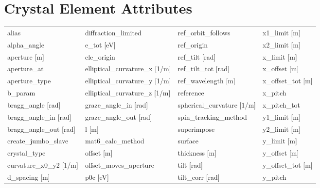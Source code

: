  \section{Crystal Element Attributes}
 \label{s:list.crystal}
 
 \begin{tabular}{llll} \toprule
alias                          & diffraction_limited            & ref_orbit_follows              & x1_limit [m]                   \\
alpha_angle                    & e_tot [eV]                     & ref_origin                     & x2_limit [m]                   \\
aperture [m]                   & ele_origin                     & ref_tilt [rad]                 & x_limit [m]                    \\
aperture_at                    & elliptical_curvature_x [1/m]   & ref_tilt_tot [rad]             & x_offset [m]                   \\
aperture_type                  & elliptical_curvature_y [1/m]   & ref_wavelength [m]             & x_offset_tot [m]               \\
b_param                        & elliptical_curvature_z [1/m]   & reference                      & x_pitch                        \\
bragg_angle [rad]              & graze_angle_in [rad]           & spherical_curvature [1/m]      & x_pitch_tot                    \\
bragg_angle_in [rad]           & graze_angle_out [rad]          & spin_tracking_method           & y1_limit [m]                   \\
bragg_angle_out [rad]          & l [m]                          & superimpose                    & y2_limit [m]                   \\
create_jumbo_slave             & mat6_calc_method               & surface                        & y_limit [m]                    \\
crystal_type                   & offset [m]                     & thickness [m]                  & y_offset [m]                   \\
curvature_x0_y2 [1/m]          & offset_moves_aperture          & tilt [rad]                     & y_offset_tot [m]               \\
d_spacing [m]                  & p0c [eV]                       & tilt_corr [rad]                & y_pitch                        \\

\end{tabular}
